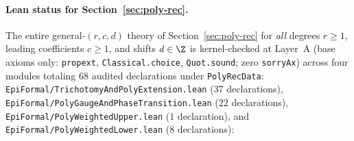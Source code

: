 \paragraph{Lean status for Section~\ref{sec:poly-rec}.}
The entire general-$(r,c,d)$ theory of Section~\ref{sec:poly-rec} for
\emph{all} degrees $r\ge1$, leading coefficients $c\ge1$, and shifts $d\in\Z$
is kernel-checked at Layer~A (base axioms only: \texttt{propext},
\texttt{Classical.choice}, \texttt{Quot.sound}; zero \texttt{sorryAx}) across
four modules totaling $68$ audited declarations under \texttt{PolyRecData}:
\texttt{EpiFormal/\allowbreak TrichotomyAndPolyExtension.lean} ($37$
declarations), \texttt{EpiFormal/\allowbreak PolyGaugeAndPhaseTransition.lean}
($22$ declarations), \texttt{EpiFormal/\allowbreak PolyWeightedUpper.lean} ($1$
declaration), and \texttt{EpiFormal/\allowbreak PolyWeightedLower.lean} ($8$
declarations):
